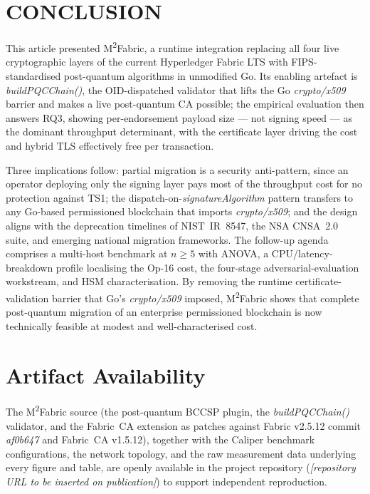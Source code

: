 \documentclass{ieeetj}
\newcommand{\mfabric}{M\textsuperscript{2}Fabric}
\begin{document}
\section{CONCLUSION} \label{sec:conclusion}

This article presented \mfabric{}, a runtime integration replacing all
four live cryptographic layers of the current Hyperledger Fabric LTS
with FIPS-standardised post-quantum algorithms in unmodified Go. Its
enabling artefact is \textit{buildPQCChain()}, the OID-dispatched
validator that lifts the Go \textit{crypto/x509} barrier and makes a
live post-quantum CA possible; the empirical evaluation then answers
RQ3, showing per-endorsement payload size --- not signing speed --- as
the dominant throughput determinant, with the certificate layer driving
the cost and hybrid TLS effectively free per transaction.

Three implications follow: partial migration is a security anti-pattern,
since an operator deploying only the signing layer pays most of the
throughput cost for no protection against TS1; the
dispatch-on-\textit{signatureAlgorithm} pattern transfers to any
Go-based permissioned blockchain that imports \textit{crypto/x509}; and
the design aligns with the deprecation timelines of NIST~IR~8547, the
NSA CNSA~2.0 suite, and emerging national migration frameworks. The
follow-up agenda comprises a multi-host benchmark at $n\geq 5$ with
ANOVA, a CPU/latency-breakdown profile localising the Op-16 cost, the
four-stage adversarial-evaluation workstream, and HSM characterisation.
By removing the runtime certificate-validation barrier that Go's
\textit{crypto/x509} imposed, \mfabric{} shows that complete
post-quantum migration of an enterprise permissioned blockchain is now
technically feasible at modest and well-characterised cost.

\section*{Artifact Availability}
The \mfabric{} source (the post-quantum BCCSP plugin, the
\textit{buildPQCChain()} validator, and the Fabric~CA extension as
patches against Fabric v2.5.12 commit \textit{af0b647} and Fabric~CA
v1.5.12), together with the Caliper benchmark configurations, the
network topology, and the raw measurement data underlying every figure
and table, are openly available in the project repository
(\textit{[repository URL to be inserted on publication]}) to support
independent reproduction.




\vfill\pagebreak
\end{document}
